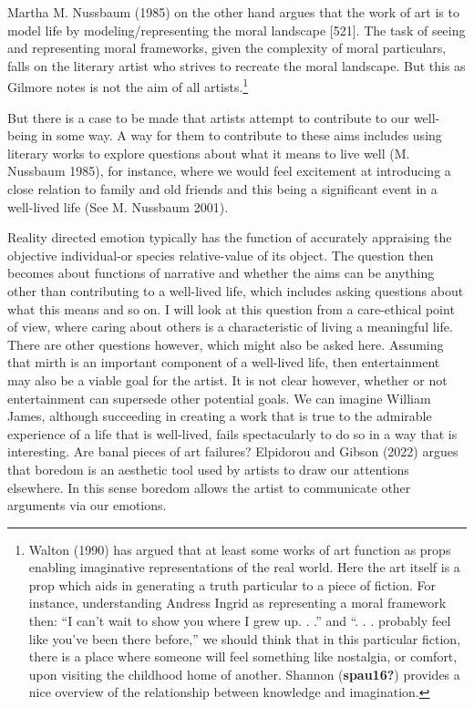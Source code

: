 \documentclass[12pt]{book}
\theoremstyle{definition}
\theoremstyle{remark}
\begin{document}
Martha M. Nussbaum (1985) on the other hand argues that the work of art is to model life by modeling/representing the moral landscape {[}521{]}. The task of seeing and representing moral frameworks, given the complexity of moral particulars, falls on the literary artist who strives to recreate the moral landscape. But this as Gilmore notes is not the aim of all artists.\footnote{Walton (1990) has argued that at least some works of art function as props enabling imaginative representations of the real world. Here the art itself is a prop which aids in generating a truth particular to a piece of fiction. For instance, understanding Andress Ingrid as representing a moral framework then: ``I can't wait to show you where I grew up. . .'' and ``. . . probably feel like you've been there before,'' we should think that in this particular fiction, there is a place where someone will feel something like nostalgia, or comfort, upon visiting the childhood home of another. Shannon (\textbf{spau16?}) provides a nice overview of the relationship between knowledge and imagination.}

But there is a case to be made that artists attempt to contribute to our well-being in some way. A way for them to contribute to these aims includes using literary works to explore questions about what it means to live well (M. Nussbaum 1985), for instance, where we would feel excitement at introducing a close relation to family and old friends and this being a significant event in a well-lived life (See M. Nussbaum 2001).

Reality directed emotion typically has the function of accurately appraising the objective individual-or species relative-value of its object. The question then becomes about functions of narrative and whether the aims can be anything other than contributing to a well-lived life, which includes asking questions about what this means and so on. I will look at this question from a care-ethical point of view, where caring about others is a characteristic of living a meaningful life. There are other questions however, which might also be asked here. Assuming that mirth is an important component of a well-lived life, then entertainment may also be a viable goal for the artist. It is not clear however, whether or not entertainment can supersede other potential goals. We can imagine William James, although succeeding in creating a work that is true to the admirable experience of a life that is well-lived, fails spectacularly to do so in a way that is interesting. Are banal pieces of art failures? Elpidorou and Gibson (2022) argues that boredom is an aesthetic tool used by artists to draw our attentions elsewhere. In this sense boredom allows the artist to communicate other arguments via our emotions.
\end{document}
